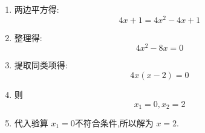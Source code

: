 \begin{questions}
\begin{enumerate}[label=(\arabic*)]
\begin{solution}
\begin{enumerate}[label=\protect\circled{\arabic*}]
				      \item 两边平方得:
				            \begin{equation*}
					            4x + 1 = 4x^2 - 4x + 1
				            \end{equation*}

				      \item 整理得:
				            \begin{equation*}
					            4x^2 -8x = 0
				            \end{equation*}

				      \item 提取同类项得:
				            \begin{equation*}
					            4x(x-2) = 0
				            \end{equation*}

				      \item 则
				            \begin{equation*}
					            x_1 = 0, x_2 = 2
				            \end{equation*}

				      \item 代入验算 \( x_1 = 0  \)不符合条件,所以解为 \( x=2 \).


\end{enumerate}
\end{solution}
\end{enumerate}
\end{questions}
